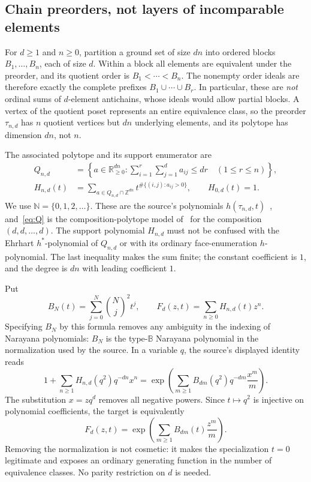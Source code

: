 \documentclass[11pt]{article}
\numberwithin{equation}{section}
\theoremstyle{definition}
\newcommand{\N}{\mathbb N}
\newcommand{\Z}{\mathbb Z}
\newcommand{\R}{\mathbb R}
\begin{document}
\subsection{Chain preorders, not layers of incomparable elements}
For $d\geq1$ and $n\geq0$, partition a ground set of size $dn$ into ordered
blocks $B_1,\ldots,B_n$, each of size $d$. Within a block all elements are
equivalent under the preorder, and its quotient order is
$B_1<\cdots<B_n$. The nonempty order ideals are therefore exactly the complete
prefixes $B_1\cup\cdots\cup B_r$. In particular, these are \emph{not} ordinal
sums of $d$-element antichains, whose ideals would allow partial blocks.
A vertex of the quotient poset represents an entire equivalence class, so the
preorder $\tau_{n,d}$ has $n$ quotient vertices but $dn$ underlying elements,
and its polytope has dimension $dn$, not $n$.

The associated polytope and its support enumerator are
\begin{align}
 Q_{n,d}&=\left\{a\in\R_{\geq0}^{dn}:
       \sum_{i=1}^{r}\sum_{j=1}^{d}a_{ij}\leq dr\quad(1\leq r\leq n)\right\},
       \label{eq:Q}\\
 H_{n,d}(t)&=\sum_{a\in Q_{n,d}\cap\Z^{dn}}t^{\#\{(i,j):a_{ij}>0\}},
       \qquad H_{0,d}(t)=1.\label{eq:H}
\end{align}
We use $\N=\{0,1,2,\ldots\}$. These are the source's polynomials
$h(\tau_{n,d},t)$~\cite[Sections~1, 5, and 9.5]{AC}, and~\eqref{eq:Q} is the
composition-polytope model of~\cite[Equation~(1)]{A} for the composition
$(d,d,\ldots,d)$. The support polynomial $H_{n,d}$ must not be confused with
the Ehrhart $h^*$-polynomial of $Q_{n,d}$ or with its ordinary
face-enumeration $h$-polynomial. The last inequality makes the sum finite;
the constant coefficient is $1$, and the degree is $dn$ with leading
coefficient $1$.

Put
\begin{equation}
 B_N(t)=\sum_{j=0}^N\binom Nj^2t^j,
 \qquad F_d(z,t)=\sum_{n\geq0}H_{n,d}(t)z^n.
 \label{eq:BFdefs}
\end{equation}
Specifying $B_N$ by this formula removes any ambiguity in the indexing of
Narayana polynomials: $B_N$ is the type-$\mathbb B$ Narayana polynomial in the
normalization used by the source. In a variable $q$, the source's displayed
identity reads
\begin{equation}
 1+\sum_{n\geq1}H_{n,d}(q^2)q^{-dn}x^n
 =\exp\left(\sum_{m\geq1}B_{dm}(q^2)q^{-dm}\frac{x^m}{m}\right).
 \label{eq:sourceform}
\end{equation}
The substitution $x=zq^d$ removes all negative powers. Since $t\mapsto q^2$
is injective on polynomial coefficients, the target is equivalently
\begin{equation}
 \boxed{F_d(z,t)=\exp\left(\sum_{m\geq1}B_{dm}(t)\frac{z^m}{m}\right).}
 \label{eq:target}
\end{equation}
Removing the normalization is not cosmetic: it makes the specialization $t=0$
legitimate and exposes an ordinary generating function in the number of
equivalence classes. No parity restriction on $d$ is needed.
\end{document}
